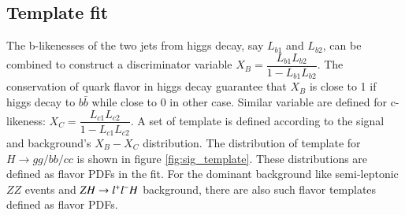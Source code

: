 \subsection{Template fit}\label{subsec:templatefit}
 The b-likenesses of the two jets from higgs decay, say $L_{b1}$ and $L_{b2}$, can be combined to construct a discriminator variable $X_B = \dfrac{L_{b1}L_{b2}}{1-L_{b1}L_{b2}}$.  The conservation of quark flavor in higgs decay guarantee that $X_B$ is close to 1 if higgs decay to $b\bar{b}$ while close to 0 in other case. 
 Similar variable are defined for c-likeness: $X_C = \dfrac{L_{c1}L_{c2}}{1-L_{c1}L_{c2}}$. A set of template is defined according to the signal and background's $X_B-X_C$ distribution.  The distribution of template for $H\to gg/bb/cc$ is shown in figure \ref{fig:sig_template}. These distributions are 
 defined as flavor PDFs in the fit. For the dominant background like semi-leptonic $ZZ$ events and $ZH\rightarrow l^{+}l^{-}H$ background, there are also such flavor templates defined as flavor PDFs.\par


